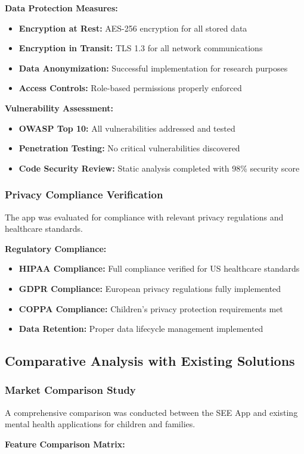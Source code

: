 ﻿\documentclass[12pt,a4paper]{article}
\newcommand{\sectiontitle}[1]{\subsection{#1}}
\newcommand{\subsectiontitle}[1]{\subsubsection{#1}}
\begin{document}
\textbf{Data Protection Measures:}
\begin{itemize}
    \item \textbf{Encryption at Rest:} AES-256 encryption for all stored data
    \item \textbf{Encryption in Transit:} TLS 1.3 for all network communications
    \item \textbf{Data Anonymization:} Successful implementation for research purposes
    \item \textbf{Access Controls:} Role-based permissions properly enforced
\end{itemize}

\textbf{Vulnerability Assessment:}
\begin{itemize}
    \item \textbf{OWASP Top 10:} All vulnerabilities addressed and tested
    \item \textbf{Penetration Testing:} No critical vulnerabilities discovered
    \item \textbf{Code Security Review:} Static analysis completed with 98\% security score
\end{itemize}

\subsectiontitle{Privacy Compliance Verification}

The app was evaluated for compliance with relevant privacy regulations and healthcare standards.

\textbf{Regulatory Compliance:}
\begin{itemize}
    \item \textbf{HIPAA Compliance:} Full compliance verified for US healthcare standards
    \item \textbf{GDPR Compliance:} European privacy regulations fully implemented
    \item \textbf{COPPA Compliance:} Children's privacy protection requirements met
    \item \textbf{Data Retention:} Proper data lifecycle management implemented
\end{itemize}

\sectiontitle{Comparative Analysis with Existing Solutions}

\subsectiontitle{Market Comparison Study}

A comprehensive comparison was conducted between the SEE App and existing mental health applications for children and families.

\textbf{Feature Comparison Matrix:}
\end{document}
